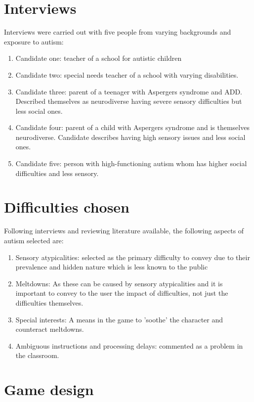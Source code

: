 \documentclass[11pt]{report}
\begin{document}
\section{Interviews}

Interviews were carried out with five people from varying backgrounds and exposure to autism:

\begin{enumerate}
\item Candidate one: teacher of a school for autistic children
\item Candidate two: special needs teacher of a school with varying disabilities.
\item Candidate three: parent of a teenager with Aspergers syndrome and ADD. Described themselves as neurodiverse having severe sensory difficulties but less social ones.
\item Candidate four: parent of a child with Aspergers syndrome and is themselves neurodiverse. Candidate describes having high sensory issues and less social ones.
\item Candidate five: person with high-functioning autism whom has higher social difficulties and less sensory.
\end{enumerate}

\section{Difficulties chosen}
Following interviews and reviewing literature available, the following aspects of autism selected are:

\begin{enumerate}
\item Sensory atypicalities: selected as the primary difficulty to convey due to their prevalence and hidden nature which is less known to the public
\item Meltdowns: As these can be caused by sensory atypicalities and it is important to convey to the user the impact of difficulties, not just the difficulties themselves.
\item Special interests: A means in the game to 'soothe' the character and counteract meltdowns.
\item Ambiguous instructions and processing delays: commented as a problem in the classroom.
\end{enumerate}

\section{Game design}
\end{document}
